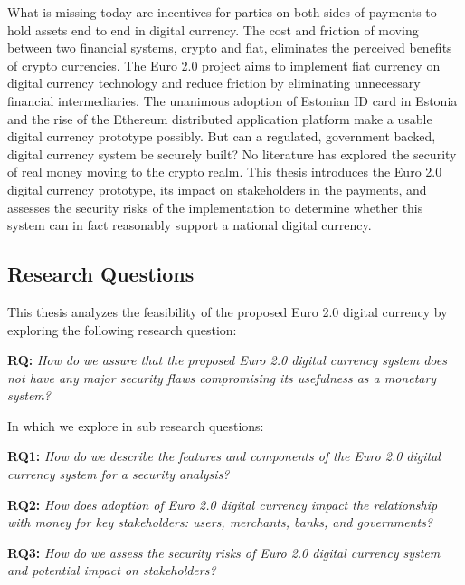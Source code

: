 \documentclass[a4paper,12pt]{article} %
\begin{document}
What is missing today are incentives for parties on both sides of payments to hold assets end to end in digital currency. The cost and friction of moving between two financial systems, crypto and fiat, eliminates the perceived benefits of crypto currencies. The Euro 2.0 project aims to implement fiat currency on digital currency technology and reduce friction by eliminating unnecessary financial intermediaries. The unanimous adoption of Estonian ID card in Estonia and the rise of the Ethereum distributed application platform make a usable digital currency prototype possibly. But can a regulated, government backed, digital currency system be securely built? No literature has explored the security of real money moving to the crypto realm. This thesis introduces the Euro 2.0 digital currency prototype, its impact on stakeholders in the payments, and assesses the security risks of the implementation to determine whether this system can in fact reasonably support a national digital currency.

\subsection{Research Questions} \label{ssec:1.2}

This thesis analyzes the feasibility of the proposed Euro 2.0 digital currency by exploring the following research question:
\begin{quoting}
	\textbf{RQ: }\textit{How do we assure that the proposed Euro 2.0 digital currency system does not have any major security flaws compromising its usefulness as a monetary system?}
\end{quoting}

In which we explore in sub research questions:
\begin{quoting}
\textbf{RQ1: }\textit{How do we describe the features and components of the Euro 2.0 digital currency system for a security analysis?}
\end{quoting}
\begin{quoting}
\textbf{RQ2: }\textit{How does adoption of Euro 2.0 digital currency impact the relationship with money for key stakeholders: users, merchants, banks, and governments?}
\end{quoting}
\begin{quoting}
\textbf{RQ3: }\textit{How do we assess the security risks of Euro 2.0 digital currency system and potential impact on stakeholders?}
\end{quoting}
\end{document}
